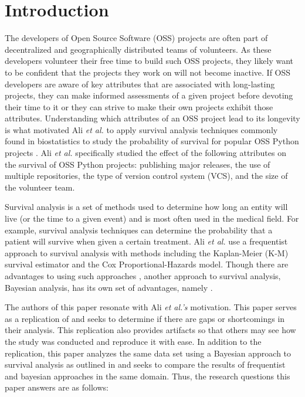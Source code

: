 \documentclass[acmconf]{acmart}
\begin{document}
\maketitle

\section{Introduction}
The developers of Open Source Software (OSS) projects are often part of decentralized and geographically distributed teams of volunteers.
As these developers volunteer their free time to build such OSS projects, they likely want to be confident that the projects they work on will not become inactive.
If OSS developers are aware of key attributes that are associated with long-lasting projects, they can make informed assessments of a given project before devoting their time to it or they can strive to make their own projects exhibit those attributes.
Understanding which attributes of an OSS project lead to its longevity is what motivated Ali \emph{et al.} to apply survival analysis techniques commonly found in biostatistics to study the probability of survival for popular OSS Python projects \cite{ali2020cheating}.
Ali \emph{et al.} specifically studied the effect of the following attributes on the survival of OSS Python projects: publishing major releases, the use of multiple repositories, the type of version control system (VCS), and the size of the volunteer team.

Survival analysis is a set of methods used to determine how long an entity will live (or the time to a given event) and is most often used in the medical field.
For example, survival analysis techniques can determine the probability that a patient will survive when given a certain treatment. 
Ali \emph{et al.} use a frequentist approach to survival analysis with methods including the Kaplan-Meier (K-M) survival estimator and the Cox Proportional-Hazards model.
Though there are advantages to using such approaches , another approach to survival analysis, Bayesian analysis, has its own set of advantages, namely .

The authors of this paper resonate with Ali \emph{et al.'s} motivation. 
This paper serves as a replication of \cite{ali2020cheating} and seeks to determine if there are gaps or shortcomings in their analysis. 
This replication also provides artifacts so that others may see how the study was conducted and reproduce it with ease. 
In addition to the replication, this paper analyzes the same data set using a Bayesian approach to survival analysis as outlined in \cite{kelter2020bayesian} and seeks to compare the results of frequentist and bayesian approaches in the same domain.
Thus, the research questions this paper answers are as follows:
\end{document}
